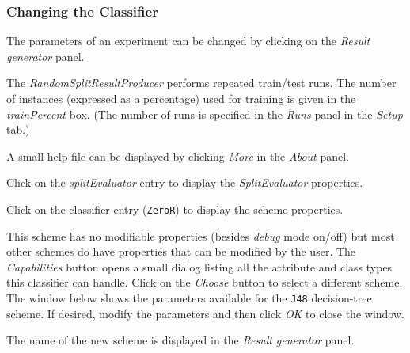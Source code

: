 \subsubsection*{Changing the Classifier}

The parameters of an experiment can be changed by clicking on the \textit{Result generator} panel.
\begin{center}
\end{center}

The \textit{RandomSplitResultProducer} performs repeated train/test runs. The number of instances (expressed as a percentage) used for training is given in the \textit{trainPercent} box. (The number of runs is specified in the \textit{Runs} panel in the \textit{Setup} tab.)

A small help file can be displayed by clicking \textit{More} in the \textit{About} panel.
\begin{center}
\end{center}

Click on the \textit{splitEvaluator} entry to display the \textit{SplitEvaluator} properties.
\begin{center}
\end{center}

Click on the classifier entry (\texttt{ZeroR}) to display the scheme properties.
\begin{center}
\end{center}

This scheme has no modifiable properties (besides \textit{debug} mode on/off) but most other schemes do have properties that can be modified by the user. The \textit{Capabilities} button opens a small dialog listing all the attribute and class types this classifier can handle. Click on the \textit{Choose} button to select a different scheme. The window below shows the parameters available for the \texttt{J48} decision-tree scheme. If desired, modify the parameters and then click \textit{OK} to close the window.
\begin{center}
\end{center}

The name of the new scheme is displayed in the \textit{Result generator} panel.
\begin{center}
\end{center}


